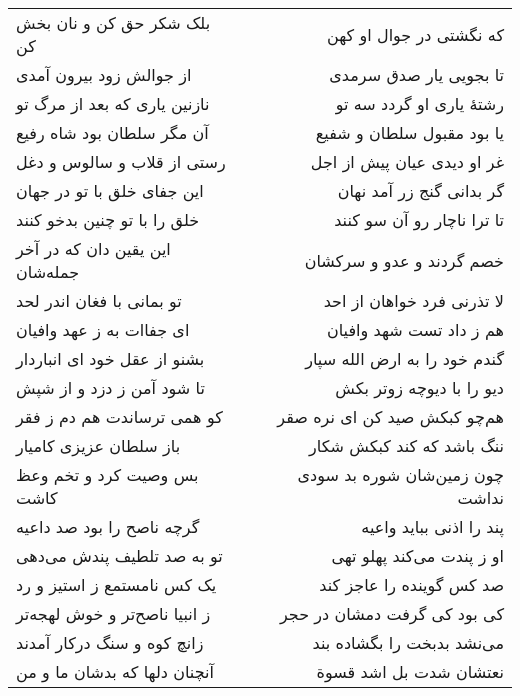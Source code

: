 \begin{center}
\begin{longtable}{l p{0.5cm} r}
بلک شکر حق کن و نان بخش کن
&&
که نگشتی در جوال او کهن
\\
از جوالش زود بیرون آمدی
&&
تا بجویی یار صدق سرمدی
\\
نازنین یاری که بعد از مرگ تو
&&
رشتهٔ یاری او گردد سه تو
\\
آن مگر سلطان بود شاه رفیع
&&
یا بود مقبول سلطان و شفیع
\\
رستی از قلاب و سالوس و دغل
&&
غر او دیدی عیان پیش از اجل
\\
این جفای خلق با تو در جهان
&&
گر بدانی گنج زر آمد نهان
\\
خلق را با تو چنین بدخو کنند
&&
تا ترا ناچار رو آن سو کنند
\\
این یقین دان که در آخر جمله‌شان
&&
خصم گردند و عدو و سرکشان
\\
تو بمانی با فغان اندر لحد
&&
لا تذرنی فرد خواهان از احد
\\
ای جفاات به ز عهد وافیان
&&
هم ز داد تست شهد وافیان
\\
بشنو از عقل خود ای انباردار
&&
گندم خود را به ارض الله سپار
\\
تا شود آمن ز دزد و از شپش
&&
دیو را با دیوچه زوتر بکش
\\
کو همی ترساندت هم دم ز فقر
&&
هم‌چو کبکش صید کن ای نره صقر
\\
باز سلطان عزیزی کامیار
&&
ننگ باشد که کند کبکش شکار
\\
بس وصیت کرد و تخم وعظ کاشت
&&
چون زمین‌شان شوره بد سودی نداشت
\\
گرچه ناصح را بود صد داعیه
&&
پند را اذنی بباید واعیه
\\
تو به صد تلطیف پندش می‌دهی
&&
او ز پندت می‌کند پهلو تهی
\\
یک کس نامستمع ز استیز و رد
&&
صد کس گوینده را عاجز کند
\\
ز انبیا ناصح‌تر و خوش لهجه‌تر
&&
کی بود کی گرفت دمشان در حجر
\\
زانچ کوه و سنگ درکار آمدند
&&
می‌نشد بدبخت را بگشاده بند
\\
آنچنان دلها که بدشان ما و من
&&
نعتشان شدت بل اشد قسوة
\\
\end{longtable}
\end{center}
